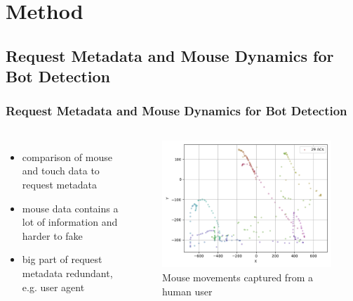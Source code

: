 \documentclass[t,aspectratio=169,table]{beamer}
\begin{document}
\section{Method}

\subsection{Request Metadata and Mouse Dynamics for Bot Detection}
\begin{frame}
\frametitle{Request Metadata and Mouse Dynamics for Bot Detection}

\begin{columns}
\begin{itemize}
    \item comparison of mouse and touch data to request metadata
    \item mouse data contains a lot of information and harder to fake
    \item big part of request metadata redundant, e.g. user agent
\end{itemize}

\begin{figure}
    \includegraphics[width=\textwidth]{figures/user_mouse_heatmap.png}
    \caption{Mouse movements captured from a human user}
\end{figure}

\end{columns}

\end{frame}
\end{document}

